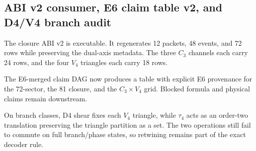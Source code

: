 \subsection{ABI v2 consumer, E6 claim table v2, and D4/V4 branch audit}
\label{sec:bt1483-bt1485-abi-v2-d4v4}

The closure ABI v2 is executable.  It regenerates 12 packets, 48 events, and 72
rows while preserving the dual-axis metadata.  The three \(C_3\) channels each
carry 24 rows, and the four \(V_4\) triangles each carry 18 rows.

The E6-merged claim DAG now produces a table with explicit E6 provenance for the
72-sector, the 81 closure, and the \(C_3\times V_4\) grid.  Blocked formula and
physical claims remain downstream.

On branch classes, D4 shear fixes each \(V_4\) triangle, while \(\tau_4\) acts as
an order-two translation preserving the triangle partition as a set.  The two
operations still fail to commute on full branch/phase states, so retwining remains
part of the exact decoder rule.
